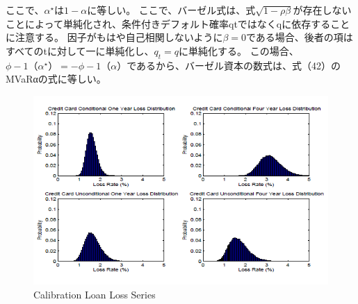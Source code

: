 \documentclass[a4j,12pt]{jarticle}
\begin{document}
ここで、$\alpha^{\star}$は$1-\alpha$に等しい。 ここで、バーゼル式は、式$\sqrt{1-\rho\beta}$が存在しないことによって単純化され、条件付きデフォルト確率qtではなくqに依存することに注意する。
因子がもはや自己相関しないように$\beta=0$である場合、後者の項はすべてのtに対して一に単純化し、$q_t=q$に単純化する。 この場合、$\phi-1（\alpha^{\star}）=-\phi-1（\alpha）$であるから、バーゼル資本の数式は、式（42）のMVaRαの式に等しい。
\begin{figure}[H]
\includegraphics{figure/ch7.png}
\caption{Calibration Loan Loss Series}
\end{figure}
\end{document}
